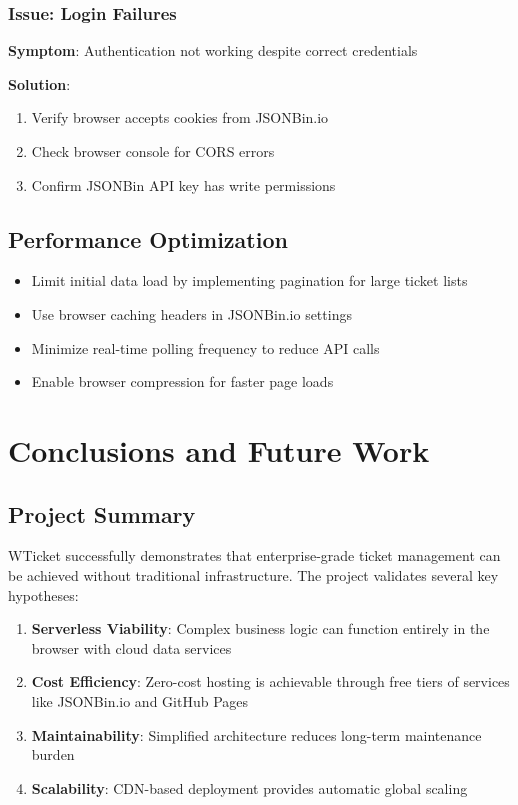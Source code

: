 \documentclass[12pt,a4paper]{report}
\begin{document}
\subsection{Issue: Login Failures}
\textbf{Symptom}: Authentication not working despite correct credentials

\textbf{Solution}:
\begin{enumerate}
    \item Verify browser accepts cookies from JSONBin.io
    \item Check browser console for CORS errors
    \item Confirm JSONBin API key has write permissions
\end{enumerate}

\section{Performance Optimization}
\label{sec:performance}

\begin{itemize}
    \item Limit initial data load by implementing pagination for large ticket lists
    \item Use browser caching headers in JSONBin.io settings
    \item Minimize real-time polling frequency to reduce API calls
    \item Enable browser compression for faster page loads
\end{itemize}

\cleardoublepage

\chapter{Conclusions and Future Work}
\thispagestyle{fancy}
\label{chap:conclusions}

\section{Project Summary}
\label{sec:project-summary}

WTicket successfully demonstrates that enterprise-grade ticket management can be achieved without traditional infrastructure. The project validates several key hypotheses:

\begin{enumerate}
    \item \textbf{Serverless Viability}: Complex business logic can function entirely in the browser with cloud data services
    \item \textbf{Cost Efficiency}: Zero-cost hosting is achievable through free tiers of services like JSONBin.io and GitHub Pages
    \item \textbf{Maintainability}: Simplified architecture reduces long-term maintenance burden
    \item \textbf{Scalability}: CDN-based deployment provides automatic global scaling
\end{enumerate}
\end{document}
